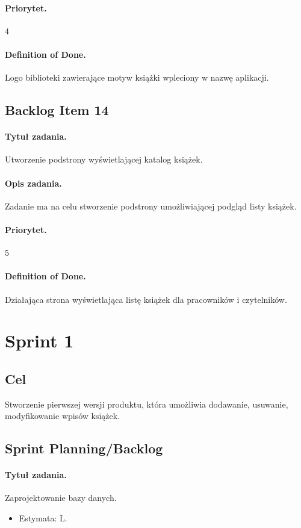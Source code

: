 \documentclass[a4paper]{article}
\begin{document}
\paragraph{Priorytet.} 4
\paragraph{Definition of Done.} Logo biblioteki zawierające motyw książki wpleciony w nazwę aplikacji.

\subsection{Backlog Item 14}
\paragraph{Tytuł zadania.} Utworzenie podstrony wyświetlającej katalog książek.
\paragraph{Opis zadania.} Zadanie ma na celu stworzenie podstrony umożliwiającej podgląd listy książek.
\paragraph{Priorytet.} 5
\paragraph{Definition of Done.} Działająca strona wyświetlająca listę książek dla pracowników i czytelników.

\section{Sprint 1}
\subsection{Cel} Stworzenie pierwszej wersji produktu, która umożliwia dodawanie, usuwanie, modyfikowanie wpisów książek.
\subsection{Sprint Planning/Backlog}

\paragraph{Tytuł zadania.}Zaprojektowanie bazy danych.
\begin{itemize}
\item Estymata: L.
\end{itemize}
\end{document}
